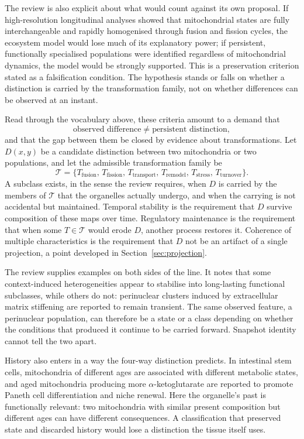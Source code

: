 \documentclass[11pt]{article}
\theoremstyle{remark}
\begin{document}
The review is also explicit about what would count against its own proposal. If high-resolution longitudinal analyses showed that mitochondrial states are fully interchangeable and rapidly homogenised through fusion and fission cycles, the ecosystem model would lose much of its explanatory power; if persistent, functionally specialised populations were identified regardless of mitochondrial dynamics, the model would be strongly supported. This is a preservation criterion stated as a falsification condition. The hypothesis stands or falls on whether a distinction is carried by the transformation family, not on whether differences can be observed at an instant.

Read through the vocabulary above, these criteria amount to a demand that
\[
\text{observed difference} \neq \text{persistent distinction},
\]
and that the gap between them be closed by evidence about transformations. Let $D(x,y)$ be a candidate distinction between two mitochondria or two populations, and let the admissible transformation family be
\[
\mathcal T=\{T_{\mathrm{fusion}},\,T_{\mathrm{fission}},\,T_{\mathrm{transport}},\,T_{\mathrm{remodel}},\,T_{\mathrm{stress}},\,T_{\mathrm{turnover}}\}.
\]
A subclass exists, in the sense the review requires, when $D$ is carried by the members of $\mathcal T$ that the organelles actually undergo, and when the carrying is not accidental but maintained. Temporal stability is the requirement that $D$ survive composition of these maps over time. Regulatory maintenance is the requirement that when some $T\in\mathcal T$ would erode $D$, another process restores it. Coherence of multiple characteristics is the requirement that $D$ not be an artifact of a single projection, a point developed in Section~\ref{sec:projection}.

The review supplies examples on both sides of the line. It notes that some context-induced heterogeneities appear to stabilise into long-lasting functional subclasses, while others do not: perinuclear clusters induced by extracellular matrix stiffening are reported to remain transient. The same observed feature, a perinuclear population, can therefore be a state or a class depending on whether the conditions that produced it continue to be carried forward. Snapshot identity cannot tell the two apart.

History also enters in a way the four-way distinction predicts. In intestinal stem cells, mitochondria of different ages are associated with different metabolic states, and aged mitochondria producing more $\alpha$-ketoglutarate are reported to promote Paneth cell differentiation and niche renewal. Here the organelle's past is functionally relevant: two mitochondria with similar present composition but different ages can have different consequences. A classification that preserved state and discarded history would lose a distinction the tissue itself uses.
\end{document}
